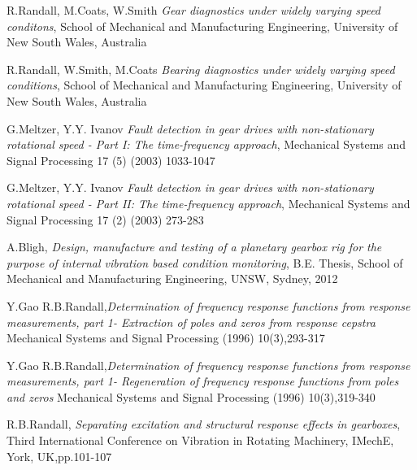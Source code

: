 \documentclass[]{unswthesis}
\begin{document}
\begin{thebibliography}{99}
  R.Randall, M.Coats, W.Smith \textit{Gear diagnostics under widely varying speed conditons}, School of Mechanical and Manufacturing Engineering, University of New South Wales, Australia
 
   R.Randall, W.Smith, M.Coats \textit{Bearing diagnostics under widely varying speed conditions}, School of Mechanical and Manufacturing Engineering, University of New South Wales, Australia
 
  G.Meltzer, Y.Y. Ivanov \textit{Fault detection in gear drives with non-stationary rotational speed - Part I: The time-frequency approach}, Mechanical Systems and Signal Processing 17 (5) (2003) 1033-1047
 
  G.Meltzer, Y.Y. Ivanov \textit{Fault detection in gear drives with non-stationary rotational speed - Part II: The time-frequency approach}, Mechanical Systems and Signal Processing 17 (2) (2003) 273-283
  
  A.Bligh, \textit{Design, manufacture and testing of a planetary gearbox rig for the purpose of internal vibration based condition monitoring}, B.E. Thesis, School of Mechanical and Manufacturing Engineering, UNSW, Sydney, 2012
 
  Y.Gao R.B.Randall,\textit{Determination of frequency response functions from response measurements, part 1- Extraction of poles and zeros from response cepstra} Mechanical Systems and Signal Processing (1996) 10(3),293-317
 
  Y.Gao R.B.Randall,\textit{Determination of frequency response functions from response measurements, part 1- Regeneration of frequency response functions from poles and zeros} Mechanical Systems and Signal Processing (1996) 10(3),319-340
 
  R.B.Randall, \textit{Separating excitation and structural response effects in gearboxes}, Third International Conference on Vibration in Rotating Machinery, IMechE, York, UK,pp.101-107
 
\end{thebibliography}



\end{document}
